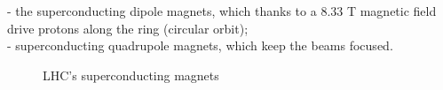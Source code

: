 \documentclass[a4paper, oneside]{book}
\begin{document}
			- the superconducting dipole magnets, which thanks to a 8.33 T magnetic field drive protons along the ring (circular orbit); \\
			- superconducting quadrupole magnets, which keep the beams focused. 
			\begin{figure}
				\centering
				 \quad
				\caption{LHC's superconducting magnets}
				\label{fig:subfig}
			\end{figure}
\end{document}
